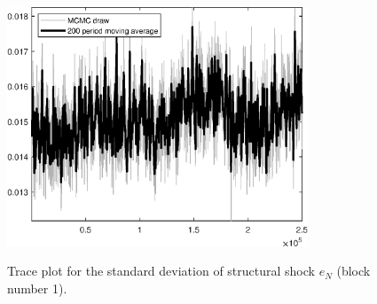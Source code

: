 \begin{figure}[H]
\centering
  \includegraphics[width=0.8\textwidth]{BRS_imp_mobility_alt/graphs/TracePlot_SE_e_N_blck_1}\\
    \caption{Trace plot for the standard deviation of structural shock ${e_N}$ (block number 1).}
\end{figure}
